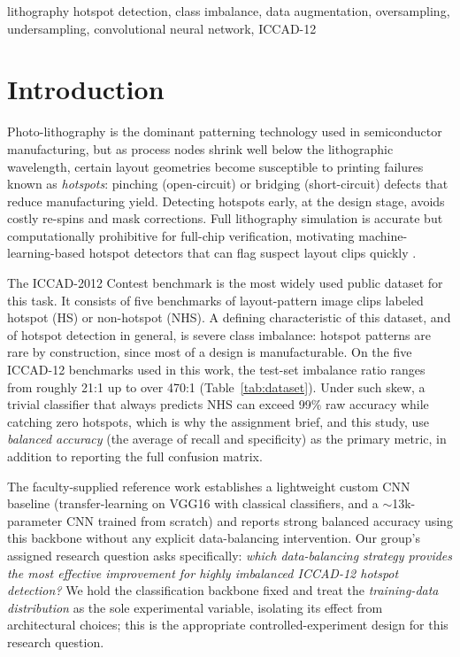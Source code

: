 \documentclass[conference]{IEEEtran}
\begin{document}
\begin{IEEEkeywords}
lithography hotspot detection, class imbalance, data augmentation, oversampling, undersampling, convolutional neural network, ICCAD-12
\end{IEEEkeywords}

\section{Introduction}
Photo-lithography is the dominant patterning technology used in
semiconductor manufacturing, but as process nodes shrink well below
the lithographic wavelength, certain layout geometries become
susceptible to printing failures known as \emph{hotspots}: pinching
(open-circuit) or bridging (short-circuit) defects that reduce
manufacturing yield. Detecting hotspots early, at the design stage,
avoids costly re-spins and mask corrections. Full lithography
simulation is accurate but computationally prohibitive for full-chip
verification, motivating machine-learning-based hotspot detectors that
can flag suspect layout clips quickly \cite{borisov2018,yang2017shallow}.

The ICCAD-2012 Contest benchmark \cite{torres2012iccad} is the most widely used
public dataset for this task. It consists of five benchmarks of
layout-pattern image clips labeled hotspot (HS) or non-hotspot (NHS).
A defining characteristic of this dataset, and of hotspot detection in
general, is severe class imbalance: hotspot patterns are rare by
construction, since most of a design is manufacturable. On the five
ICCAD-12 benchmarks used in this work, the test-set imbalance ratio
ranges from roughly 21:1 up to over 470:1 (Table~\ref{tab:dataset}).
Under such skew, a trivial classifier that always predicts NHS can
exceed 99\% raw accuracy while catching zero hotspots, which is why
the assignment brief, and this study, use \emph{balanced accuracy}
(the average of recall and specificity) as the primary metric, in
addition to reporting the full confusion matrix.

The faculty-supplied reference work \cite{borisov2018} establishes a
lightweight custom CNN baseline (transfer-learning on VGG16 with
classical classifiers, and a $\sim$13k-parameter CNN trained from
scratch) and reports strong balanced accuracy using this backbone
without any explicit data-balancing intervention. Our group's assigned
research question asks specifically: \emph{which data-balancing
strategy provides the most effective improvement for highly imbalanced
ICCAD-12 hotspot detection?} We hold the classification backbone fixed
and treat the \emph{training-data distribution} as the sole
experimental variable, isolating its effect from architectural
choices; this is the appropriate controlled-experiment design for
this research question.
\end{document}

